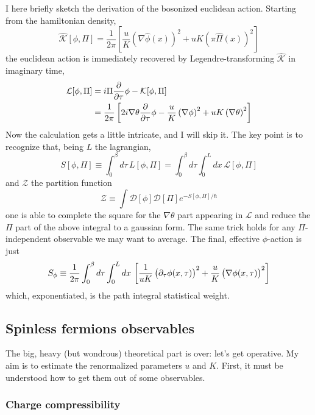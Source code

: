 I here briefly sketch the derivation of the bosonized euclidean action. Starting from the hamiltonian density,
\[
	\hat{\mathcal{K}}[\phi, \Pi] = \frac{1}{2\pi} \left[
			\frac{u}{K} \left( \nabla \hat \phi(x) \right)^2 + uK \left( \pi \hat \Pi(x) \right)^2
	\right]
\]
the euclidean action is immediately recovered by Legendre-transforming $\hat{\mathcal{K}}$ in imaginary time,
\[
	\begin{aligned}
		\mathcal{L}[\phi, \Pi] &= i \Pi \pdv{\tau} \phi - \mathcal{K} [\phi, \Pi] \\
		&= \frac{1}{2\pi} \left[
			2i \nabla \theta \pdv{\tau} \phi
			- \frac{u}{K} \left( \nabla \phi \right)^2 + uK \left( \nabla \theta \right)^2
		\right]
	\end{aligned}
\]
Now the calculation gets a little intricate, and I will skip it. The key point is to recognize that, being $L$ the lagrangian,
\[
	S[\phi, \Pi] \equiv \int_0^\beta d\tau \, L[\phi, \Pi] = \int_0^\beta d\tau \int_0^L dx \,  \mathcal{L}[\phi, \Pi]
\]
and $\mathcal{Z}$ the partition function
\[
	\mathcal{Z} \equiv \int \mathcal{D}[\phi] \mathcal{D}[\Pi] e^{-S[\phi, \Pi] /\hbar}
\]
one is able to complete the square for the $\nabla \theta$ part appearing in $\mathcal{L}$ and reduce the $\Pi$ part of the above integral to a gaussian form. The same trick holds for any $\Pi$-independent observable we may want to average. The final, effective $\phi$-action is just
\begin{equation}\label{eq:phi-action}
	S_\phi \equiv \frac{1}{2\pi} \int_0^\beta d\tau \int_0^L dx \, \left[
		\frac{1}{uK} \left(
			\vphantom{A^A}
			\partial_\tau \phi(x,\tau)
		\right)^2 + \frac{u}{K} \left(
			\vphantom{A^A}
			\nabla \phi(x,\tau) 
		\right)^2
	\right]
\end{equation}
which, exponentiated, is the path integral statistical weight.

\subsection{Spinless fermions observables}\label{subsubsec:spinless-fermions-observables}

The big, heavy (but wondrous) theoretical part is over: let's get operative. My aim is to estimate the renormalized parameters $u$ and $K$. First, it must be understood how to get them out of some observables.

\subsubsection{Charge compressibility}

